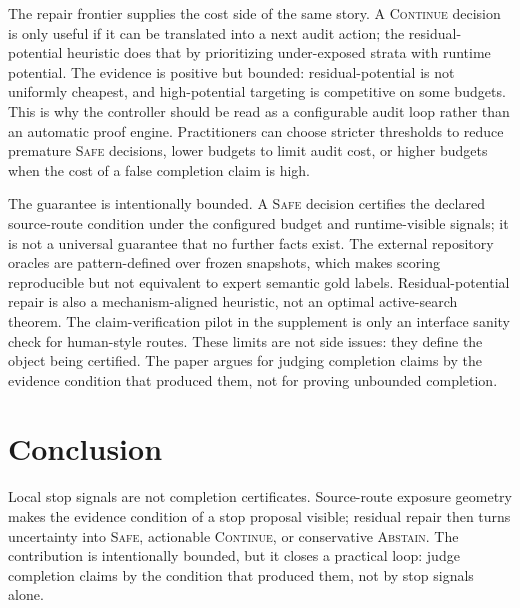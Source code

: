 \documentclass[letterpaper,10pt,twocolumn]{article}
\newcommand{\safe}{\textsc{Safe}}
\newcommand{\cont}{\textsc{Continue}}
\newcommand{\abstain}{\textsc{Abstain}}
\begin{document}
The repair frontier supplies the cost side of the same story. A \cont{} decision
is only useful if it can be translated into a next audit action; the
residual-potential heuristic does that by prioritizing under-exposed strata with
runtime potential. The evidence is positive but bounded: residual-potential is
not uniformly cheapest, and high-potential targeting is competitive on some
budgets. This is why the controller should be read as a configurable audit loop
rather than an automatic proof engine. Practitioners can choose stricter
thresholds to reduce premature \safe{} decisions, lower budgets to limit audit
cost, or higher budgets when the cost of a false completion claim is high.

The guarantee is intentionally bounded. A \safe{} decision certifies the
declared source-route condition under the configured budget and runtime-visible
signals; it is not a universal guarantee that no further facts exist. The
external repository oracles are pattern-defined over frozen snapshots, which
makes scoring reproducible but not equivalent to expert semantic gold labels.
Residual-potential repair is also a mechanism-aligned heuristic, not an optimal
active-search theorem. The claim-verification pilot in the supplement is only an
interface sanity check for human-style routes. These limits are not side issues:
they define the object being certified. The paper argues for judging completion
claims by the evidence condition that produced them, not for proving unbounded
completion.

\section{Conclusion}

Local stop signals are not completion certificates. Source-route exposure
geometry makes the evidence condition of a stop proposal visible; residual repair
then turns uncertainty into \safe{}, actionable \cont{}, or conservative
\abstain{}. The contribution is intentionally bounded, but it closes a practical
loop: judge completion claims by the condition that produced them, not by stop
signals alone.

\clearpage


\end{document}
